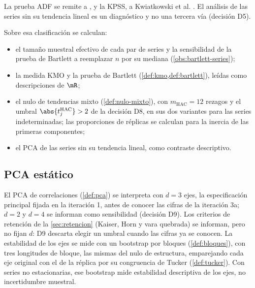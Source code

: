 La prueba ADF se remite a \textcite{dickey_fuller_1979}
, y la KPSS, a
Kwiatkowski et al. . El análisis de las
series sin su tendencia lineal es un diagnóstico y no una tercera vía (decisión D5).

Sobre esa clasificación se calculan:

\begin{itemize}[leftmargin=*]
  \item el tamaño muestral efectivo de cada par de series y la sensibilidad de la prueba de
    Bartlett a reemplazar $n$ por su mediana (\cref{obs:bartlett-series});
  \item la medida KMO y la prueba de Bartlett (\cref{def:kmo,def:bartlett}), leídas como
    descripciones de $\mR$;
  \item el nulo de tendencias mixto (\cref{def:nulo-mixto}), con $m_{\mathrm{HAC}}=12$ rezagos y el
    umbral $\abs{t^{\mathrm{HAC}}_j}>2$ de la decisión D8, en sus dos variantes para las series
    indeterminadas; las proporciones de réplicas se calculan para la inercia de las primeras
    componentes;
  \item el PCA de las series sin su tendencia lineal, como contraste descriptivo.
\end{itemize}

\subsection{PCA estático}
\label{sec:met-pca}

El PCA de correlaciones (\cref{def:pca}) se interpreta con $d=3$ ejes, la especificación principal
fijada en la iteración 1, antes de conocer las cifras de la iteración 3a; $d=2$ y $d=4$ se informan
como sensibilidad (decisión D9). Los criterios de retención de la \cref{sec:retencion} (Kaiser,
Horn y vara quebrada) se informan, pero no fijan $d$: D9 descarta elegir un umbral cuando las
cifras ya se conocen. La estabilidad de los ejes se mide con un bootstrap por bloques
(\cref{def:bloques}), con tres longitudes de bloque, las mismas del nulo de estructura, emparejando
cada eje original con el de la réplica por su congruencia de Tucker (\cref{def:tucker}). Con
series no estacionarias, ese bootstrap mide estabilidad descriptiva de los ejes, no incertidumbre
muestral.

